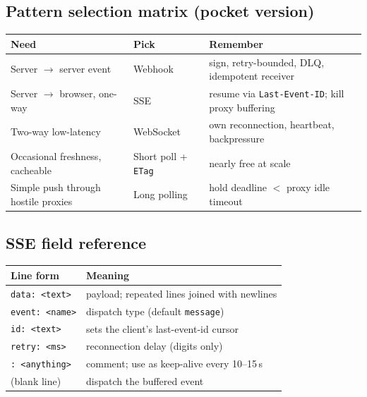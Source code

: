 \subsection*{Pattern selection matrix (pocket version)}
\begin{table}[h]
  \centering
  \small
  \begin{tabularx}{\textwidth}{l l X}
    \toprule
    \textbf{Need} & \textbf{Pick} & \textbf{Remember} \\
    \midrule
    Server $\to$ server event & Webhook & sign, retry-bounded, DLQ, idempotent receiver \\
    Server $\to$ browser, one-way & SSE & resume via \texttt{Last-Event-ID}; kill proxy buffering \\
    Two-way low-latency & WebSocket & own reconnection, heartbeat, backpressure \\
    Occasional freshness, cacheable & Short poll + \texttt{ETag} & nearly free at scale \\
    Simple push through hostile proxies & Long polling & hold deadline $<$ proxy idle timeout \\
    \bottomrule
  \end{tabularx}
\end{table}

\subsection*{SSE field reference}
\begin{table}[h]
  \centering
  \small
  \begin{tabularx}{\textwidth}{l X}
    \toprule
    \textbf{Line form} & \textbf{Meaning} \\
    \midrule
    \texttt{data: <text>} & payload; repeated lines joined with newlines \\
    \texttt{event: <name>} & dispatch type (default \texttt{message}) \\
    \texttt{id: <text>} & sets the client's last-event-id cursor \\
    \texttt{retry: <ms>} & reconnection delay (digits only) \\
    \texttt{: <anything>} & comment; use as keep-alive every 10--15\,s \\
    (blank line) & dispatch the buffered event \\
    \bottomrule
  \end{tabularx}
\end{table}

